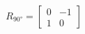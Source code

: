 \documentclass[preview]{standalone}
\begin{document}
\begin{align*}
R_{90°} = \begin{bmatrix} 0 & -1 \\ 1 & 0 \end{bmatrix}
\end{align*}
\end{document}
